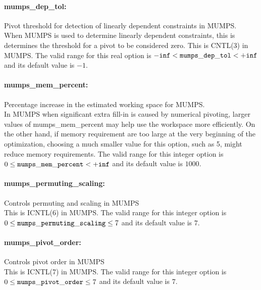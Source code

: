 \paragraph{mumps\_dep\_tol:}\label{sec:mumps_dep_tol} Pivot threshold for detection of linearly dependent constraints in MUMPS. $\;$ \\
 When MUMPS is used to determine linearly
dependent constraints, this is determines the
threshold for a pivot to be considered zero. 
This is CNTL(3) in MUMPS. The valid range for this real option is 
${\tt -inf} <  {\tt mumps\_dep\_tol } <  {\tt +inf}$
and its default value is $-1$.


\paragraph{mumps\_mem\_percent:}\label{sec:mumps_mem_percent} Percentage increase in the estimated working space for MUMPS. $\;$ \\
 In MUMPS when significant extra fill-in is caused
by numerical pivoting, larger values of
mumps\_mem\_percent may help use the workspace
more efficiently.  On the other hand, if memory
requirement are too large at the very beginning
of the optimization, choosing a much smaller
value for this option, such as 5, might reduce
memory requirements. The valid range for this integer option is
$0 \le {\tt mumps\_mem\_percent } <  {\tt +inf}$
and its default value is $1000$.


\paragraph{mumps\_permuting\_scaling:}\label{sec:mumps_permuting_scaling} Controls permuting and scaling in MUMPS $\;$ \\
 This is ICNTL(6) in MUMPS. The valid range for this integer option is
$0 \le {\tt mumps\_permuting\_scaling } \le 7$
and its default value is $7$.


\paragraph{mumps\_pivot\_order:}\label{sec:mumps_pivot_order} Controls pivot order in MUMPS $\;$ \\
 This is ICNTL(7) in MUMPS. The valid range for this integer option is
$0 \le {\tt mumps\_pivot\_order } \le 7$
and its default value is $7$.


